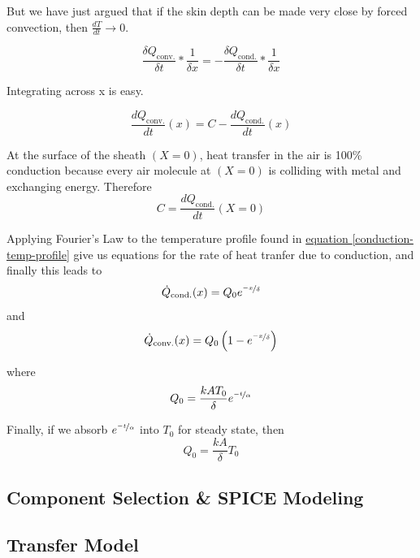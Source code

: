 \documentclass[10pt, twocolumn]{article}
\begin{document}
But we have just argued that if the skin depth can be made very close
by forced convection, then $\frac{dT}{dt}\rightarrow 0$.

\begin{equation*}
\frac{\delta Q_{\textrm{conv.}}}{\delta t}*\frac{1}{\delta x}=-
\frac{\delta Q_{\textrm{cond.}}}{\delta t}*\frac{1}{\delta x}
\end{equation*}

Integrating across x is easy.

\begin{equation*}
\frac{dQ_{\textrm{conv.}}}{dt}(x)=C-
\frac{dQ_{\textrm{cond.}}}{dt}(x)
\end{equation*}

At the surface of the sheath \((X=0)\), heat transfer in the air is
100\% conduction because every air molecule at \((X=0)\) is colliding
with metal and exchanging energy. Therefore
\begin{equation*}
C=\frac{dQ_{\textrm{cond.}}}{dt}(X=0)
\end{equation*}

Applying Fourier's Law to the temperature profile found in
\hyperref[conduction-temp-profile]{equation \ref{conduction-temp-profile}}
give us equations for the rate of heat tranfer due to conduction,
and finally this leads to
\begin{equation*}
\dot{Q}_{\textrm{cond.}}(x)=Q_{0}e^{\nicefrac{-x}{\delta}}
\end{equation*}
and
\begin{equation*}
\dot{Q}_{\textrm{conv.}}(x)=Q_{0}\left(1-e^{\nicefrac{-x}{\delta}}\right)
\end{equation*}

where
\begin{equation*}
Q_{0}=\frac{kAT_{0}}{\delta}e^{\nicefrac{-t}{\alpha}}
\end{equation*}

Finally, if we absorb $e^{\nicefrac{-t}{\alpha}}$ into $T_{0}$ for steady state, then
\begin{equation}
Q_{0}=\frac{kA}{\delta}T_{0}
\end{equation}





\subsection{Component Selection \& SPICE Modeling}

\subsection{Transfer Model}
\end{document}
